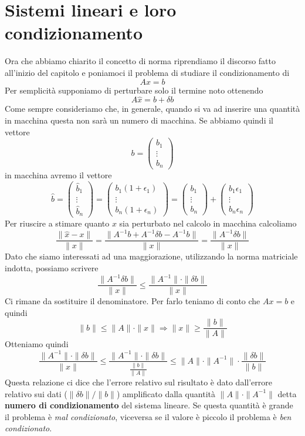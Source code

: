 \section{Sistemi lineari e loro condizionamento}
Ora che abbiamo chiarito il concetto di norma riprendiamo il discorso fatto all'inizio del capitolo e poniamoci
il problema di studiare il condizionamento di
\[ A x = b \]
Per semplicità supponiamo di perturbare solo il termine noto ottenendo
\[ A \hat{x} = b + \delta b \]
Come sempre consideriamo che, in generale, quando si va ad inserire una quantità in macchina questa non sarà un
numero di macchina. Se abbiamo quindi il vettore
\[ b = \begin{pmatrix} b_1 \\ \vdots \\ b_n \end{pmatrix} \]
in macchina avremo il vettore
\[
	\hat{b} = \begin{pmatrix} \hat{b}_1 \\ \vdots \\ \hat{b}_n \end{pmatrix} =
	\begin{pmatrix} b_1 (1 + \epsilon_1) \\ \vdots \\ b_n (1 + \epsilon_n)	\end{pmatrix} =
	\begin{pmatrix} b_1 \\ \vdots \\ b_n \end{pmatrix} +
	\begin{pmatrix} b_1 \epsilon_1 \\ \vdots \\ b_n \epsilon_n \end{pmatrix}
\]
Per riuscire a stimare quanto $x$ sia perturbato nel calcolo in macchina calcoliamo
\[
	\frac{\| \hat{x} - x \|}{\| x \|} =
	\frac{\| A^{-1} b + A^{-1} \delta b - A^{-1} b \|}{\| x \|} =
	\frac{\| A^{-1} \delta b \|}{\| x \|}
\]
Dato che siamo interessati ad una maggiorazione, utilizzando la norma matriciale indotta, possiamo scrivere
\[ \frac{\| A^{-1} \delta b \|}{\| x \|} \leq \frac{\| A^{-1} \| \cdot \| \delta b \|}{\| x \|} \]
Ci rimane da sostituire il denominatore. Per farlo teniamo di conto che $A x = b$ e quindi
\[ \| b \| \leq \| A \| \cdot \| x \| \Rightarrow \| x \| \geq \frac{\| b \|}{\| A \|} \]
Otteniamo quindi
\[
	\frac{\| A^{-1} \| \cdot \| \delta b \|}{\| x \|} \leq
	\frac{\| A^{-1} \| \cdot \| \delta b \|}{\frac{\| b \|}{\| A \|}} \leq
	\| A \| \cdot \| A^{-1} \| \cdot \frac{\| \delta b \|}{\| b \|}
\]
Questa relazione ci dice che l'errore relativo sul risultato è dato dall'errore relativo sui dati
($\| \delta b \| / \| b \|$) amplificato dalla quantità $\| A \| \cdot \| A^{-1} \|$ detta
\textbf{numero di condizionamento} del sistema lineare. Se questa quantità è grande il problema è
\emph{mal condizionato}, viceversa se il valore è piccolo il problema è \emph{ben condizionato}.